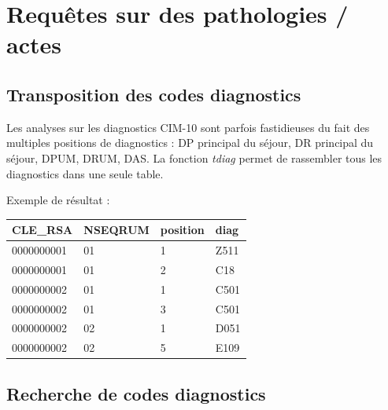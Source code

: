 \documentclass[
]{book}
\newenvironment{Shaded}{\begin{snugshade}}{\end{snugshade}}
\newcommand{\CommentTok}[1]{\textcolor[rgb]{0.56,0.35,0.01}{\textit{#1}}}
\newcommand{\FunctionTok}[1]{\textcolor[rgb]{0.00,0.00,0.00}{#1}}
\newcommand{\NormalTok}[1]{#1}
\newcommand{\OtherTok}[1]{\textcolor[rgb]{0.56,0.35,0.01}{#1}}
\newcommand{\SpecialCharTok}[1]{\textcolor[rgb]{0.00,0.00,0.00}{#1}}
\begin{document}
\hypertarget{requuxeates-sur-des-pathologies-actes}{%
\chapter{Requêtes sur des pathologies / actes}\label{requuxeates-sur-des-pathologies-actes}}

\hypertarget{transposition-des-codes-diagnostics}{%
\section{Transposition des codes diagnostics}\label{transposition-des-codes-diagnostics}}

Les analyses sur les diagnostics CIM-10 sont parfois fastidieuses du fait des multiples positions de diagnostics : DP principal du séjour, DR principal du séjour, DPUM, DRUM, DAS. La fonction \emph{tdiag} permet de rassembler tous les diagnostics dans une seule table.

\begin{Shaded}
\end{Shaded}

Exemple de résultat :

\begin{longtable}[]{@{}llll@{}}
\toprule
CLE\_RSA & NSEQRUM & position & diag \\
\midrule
\endhead
0000000001 & 01 & 1 & Z511 \\
0000000001 & 01 & 2 & C18 \\
0000000002 & 01 & 1 & C501 \\
0000000002 & 01 & 3 & C501 \\
0000000002 & 02 & 1 & D051 \\
0000000002 & 02 & 5 & E109 \\
\bottomrule
\end{longtable}

\hypertarget{recherche-de-codes-diagnostics}{%
\section{Recherche de codes diagnostics}\label{recherche-de-codes-diagnostics}}
\end{document}
